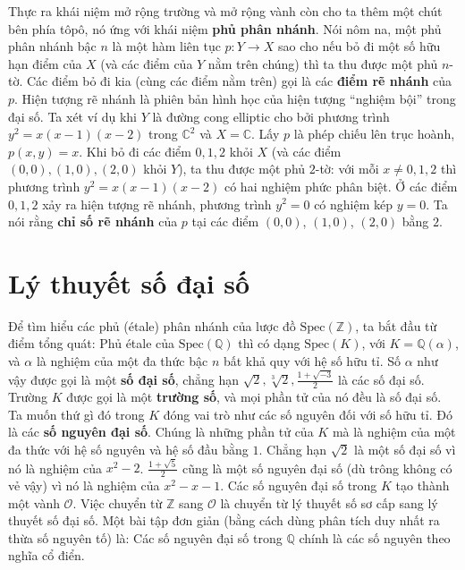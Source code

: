 \documentclass[12pt]{article}
\begin{document}
Thực ra khái niệm mở rộng trường và mở rộng vành còn cho ta thêm một chút bên phía tôpô, nó ứng với khái niệm {\bf phủ phân nhánh}. Nói nôm na, một phủ phân nhánh bậc $n$ là một hàm liên tục $p: Y \to X$ sao cho nếu bỏ đi một số hữu hạn điểm của $X$ (và các điểm của $Y$ nằm trên chúng) thì ta thu được một phủ $n$-tờ. Các điểm bỏ đi kia (cùng các điểm nằm trên) gọi là các {\bf điểm rẽ nhánh} của $p$. Hiện tượng rẽ nhánh là phiên bản hình học của hiện tượng ``nghiệm bội'' trong đại số. Ta xét ví dụ khi $Y$ là đường cong elliptic cho bởi phương trình $y^2=x(x-1)(x-2)$ trong $\mathbb{C}^2$ và $X = \mathbb{C}$. Lấy $p$ là phép chiếu lên trục hoành, $p(x,y) = x$. Khi bỏ đi các điểm $0, 1, 2$ khỏi $X$ (và các điểm $(0,0), (1,0), (2,0)$ khỏi $Y$), ta thu được một phủ $2$-tờ: với mỗi $x \neq 0,1,2$ thì phương trình $y^2=x(x-1)(x-2)$ có hai nghiệm phức phân biệt. Ở các điểm $0, 1, 2$ xảy ra hiện tượng rẽ nhánh, phương trình $y^2=0$ có nghiệm kép $y=0$. Ta nói rằng {\bf chỉ số rẽ nhánh} của $p$ tại các điểm $(0,0)$, $(1,0)$, $(2,0)$ bằng $2$.




\section{Lý thuyết số đại số}

Để tìm hiểu các phủ (étale) phân nhánh của lược đồ $\text{Spec}(\mathbb{Z})$, ta bắt đầu từ điểm tổng quát: Phủ étale của $\text{Spec}(\mathbb{Q})$ thì có dạng $\text{Spec}(K)$, với $K = \mathbb{Q}(\alpha)$, và $\alpha$ là nghiệm của một đa thức bậc $n$ bất khả quy với hệ số hữu tỉ. Số $\alpha$ như vậy được gọi là một {\bf số đại số}, chẳng hạn $\sqrt{2}, \sqrt[3]{2}, \frac{1 + \sqrt{-3}}{2}$ là các số đại số. Trường $K$ được gọi là một {\bf trường số}, và mọi phần tử của nó đều là số đại số. Ta muốn thứ gì đó trong $K$ đóng vai trò như các số nguyên đối với số hữu tỉ. Đó là các {\bf số nguyên đại số}. Chúng là những phần tử của $K$ mà là nghiệm của một đa thức với hệ số nguyên và hệ số đầu bằng $1$. Chẳng hạn $\sqrt{2}$ là một số đại số vì nó là nghiệm của $x^2 - 2$. $\frac{1 + \sqrt{5}}{2}$ cũng là một số nguyên đại số (dù trông không có vẻ vậy) vì nó là nghiệm của $x^2-x-1$. Các số nguyên đại số trong $K$ tạo thành một vành $\mathcal{O}$. Việc chuyển từ $\mathbb{Z}$ sang $\mathcal{O}$ là chuyển từ lý thuyết số sơ cấp sang lý thuyết số đại số. Một bài tập đơn giản (bằng cách dùng phân tích duy nhất ra thừa số nguyên tố) là: Các số nguyên đại số trong $\mathbb{Q}$ chính là các số nguyên theo nghĩa cổ điển.
\end{document}
